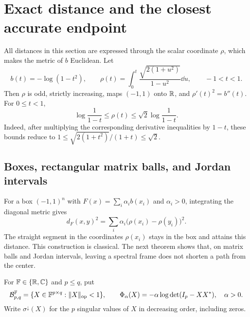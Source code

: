 \section{Exact distance and the closest accurate endpoint}
\label{sec:exact-distance}

All distances in this section are expressed through the scalar
coordinate $\rho$, which makes the metric of $b$ Euclidean. Let
\begin{equation}
 b(t)=-\log(1-t^2),\qquad
 \rho(t)=\int_0^t\frac{\sqrt{2(1+u^2)}}{1-u^2}\dd u,
 \qquad -1<t<1.
 \label{eq:rho-def}
\end{equation}
Then $\rho$ is odd, strictly increasing, maps $(-1,1)$ onto $\mathbb R$, and
$\rho'(t)^2=b''(t)$. For $0\leq t<1$,
\begin{equation}
 \log\frac1{1-t}\leq\rho(t)\leq\sqrt2\log\frac1{1-t}.
 \label{eq:rho-log}
\end{equation}
Indeed, after multiplying the corresponding derivative inequalities by
$1-t$, these bounds reduce to
$1\leq\sqrt{2(1+t^2)}/(1+t)\leq\sqrt2$.

\subsection{Boxes, rectangular matrix balls, and Jordan intervals}
For a box $(-1,1)^n$ with $F(x)=\sum_i\alpha_i b(x_i)$ and
$\alpha_i>0$, integrating the diagonal metric gives
\begin{equation}
 d_F(x,y)^2=\sum_i\alpha_i\bigl(\rho(x_i)-\rho(y_i)\bigr)^2.
 \label{eq:box-distance}
\end{equation}
The straight segment in the coordinates $\rho(x_i)$ stays in the box
and attains this distance. This construction is classical. The next
theorem shows that, on matrix balls and Jordan intervals, leaving a
spectral frame does not shorten a path from the center.

For $\mathbb F\in\{\mathbb R,\mathbb C\}$ and $p\leq q$, put
\begin{equation}
 \mathcal B_{p,q}^{\mathbb F}=\{X\in\mathbb F^{p\times q}:\lVert X\rVert_{\mathrm{op}}<1\},\qquad
 \Phi_\alpha(X)=-\alpha\log\det(I_p-XX^*),\quad \alpha>0.
 \label{eq:matrix-ball}
\end{equation}
Write $\sigma^\downarrow(X)$ for the $p$ singular values of $X$ in
decreasing order, including zeros.

